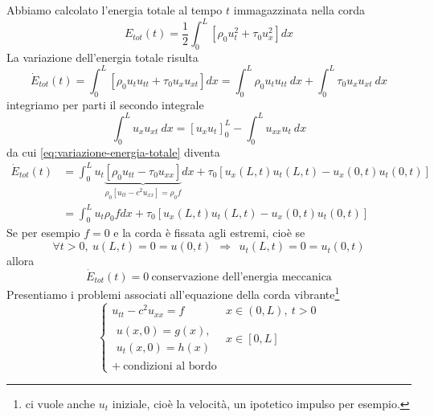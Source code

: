 \documentclass[10pt,a4paper,twoside,openright]{book}
\begin{document}
Abbiamo calcolato l'energia totale al tempo $t$ immagazzinata nella corda
\begin{equation*}
	E_{tot}( t) =\frac{1}{2}\int ^{L}_{0}\left[ \rho _{0} u^{2}_{t} +\tau _{0} u^{2}_{x}\right] dx
\end{equation*}
La variazione dell'energia totale risulta
\begin{equation}
	\dot{E}_{tot}( t) =\int ^{L}_{0}[ \rho _{0} u_{t} u_{tt} +\tau _{0} u_{x} u_{xt}] dx=\int ^{L}_{0} \rho _{0} u_{t} u_{tt} \ dx+\int ^{L}_{0} \tau _{0} u_{x} u_{xt} \ dx
	\label{eq:variazione-energia-totale}
\end{equation}
integriamo per parti il secondo integrale
\begin{equation*}
	\int ^{L}_{0} u_{x} u_{xt} \ dx=[ u_{x} u_{t}]^{L}_{0} -\int ^{L}_{0} u_{xx} u_{t} \ dx
\end{equation*}
da cui \eqref{eq:variazione-energia-totale} diventa
\begin{align*}
	\dot{E}_{tot}( t) & =\int ^{L}_{0} u_{t}\underbrace{[ \rho _{0} u_{tt} -\tau _{0} u_{xx}]}_{\rho _{0}\left[ u_{tt} -c^{2} u_{xx}\right] =\rho _{0} f} dx+\tau _{0}[ u_{x}( L,t) u_{t}( L,t) -u_{x}( 0,t) u_{t}( 0,t)] \\
	                  & =\int ^{L}_{0} u_{t} \rho _{0} fdx+\tau _{0}[ u_{x}( L,t) u_{t}( L,t) -u_{x}( 0,t) u_{t}( 0,t)]                                                                                                   
\end{align*}
Se per esempio $f=0$ e la corda è fissata agli estremi, cioè se
\begin{equation*}
	\forall t >0,\ u( L,t) =0=u( 0,t) \ \ \Rightarrow \ \ u_{t}( L,t) =0=u_{t}( 0,t)
\end{equation*}
allora
\begin{equation*}
	\dot{E}_{tot}( t) =0\ \text{conservazione dell'energia meccanica}
\end{equation*}
Presentiamo i problemi associati all'equazione della corda vibrante\footnote{ci vuole anche $u_{t}$ iniziale, cioè la velocità, un ipotetico impulso per esempio.}
\begin{equation*}
	\begin{cases}
		u_{tt} -c^{2} u_{xx} =f       & x\in ( 0,L) ,\ t >0 \\
		\begin{array}{l}
		u( x,0) =g( x) ,\\
		u_{t}( x,0) =h( x)
		\end{array}                   & x\in [ 0,L]         \\
		+\ \text{condizioni al bordo} &                     
	\end{cases}
\end{equation*}
\end{document}
